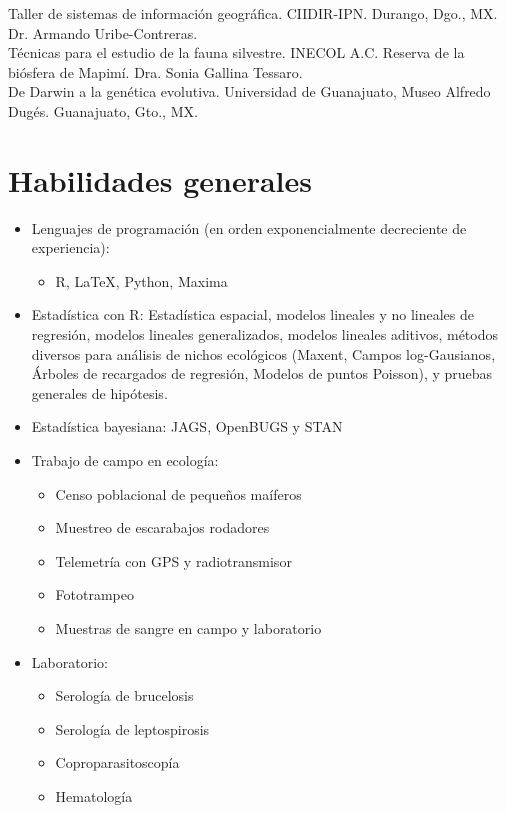 \documentclass[11pt, letter]{article}
\newcommand{\years}[1]{\marginnote{\scriptsize #1}}
\begin{document}
\years{2011} Taller de sistemas de informaci\'on geogr\'afica. CIIDIR-IPN. Durango, Dgo., MX. Dr. Armando Uribe-Contreras.\\

\years{2008} T\'ecnicas para el estudio de la fauna silvestre. INECOL A.C. Reserva de la bi\'osfera de Mapim\'i. Dra. Sonia Gallina Tessaro.\\

\years{2006} De Darwin a la gen\'etica evolutiva. Universidad de Guanajuato, Museo Alfredo Dug\'es. Guanajuato, Gto., MX.

\section*{Habilidades generales}
\begin{itemize}
	\item Lenguajes de programaci\'on (en orden exponencialmente decreciente de experiencia):
	\begin{itemize}
		\item R, \LaTeX, Python, Maxima
	\end{itemize}
	\item Estad\'istica con R: Estad\'istica espacial, modelos lineales y no lineales de regresi\'on, modelos lineales generalizados, modelos lineales aditivos, m\'etodos diversos para an\'alisis de nichos ecol\'ogicos (Maxent, Campos log-Gausianos, \'Arboles de recargados de regresi\'on, Modelos de puntos Poisson), y pruebas generales de hip\'otesis.
	\item Estad\'istica bayesiana: JAGS, OpenBUGS y STAN
	\item Trabajo de campo en ecolog\'ia:
	\begin{itemize}
		\item Censo poblacional de peque\~nos ma\'iferos
		\item Muestreo de escarabajos rodadores
		\item Telemetr\'ia con GPS y radiotransmisor
		\item Fototrampeo
		\item Muestras de sangre en campo y laboratorio
	\end{itemize}
	\item Laboratorio:
	\begin{itemize}
		\item Serolog\'ia de brucelosis
		\item Serolog\'ia de leptospirosis
		\item Coproparasitoscop\'ia
		\item Hematolog\'ia

\end{itemize}
\end{itemize}
\end{document}
